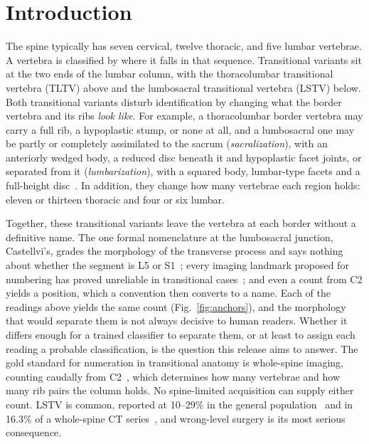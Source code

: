 \documentclass[aapm,mph,amsmath,amssymb,preprint,linenumbers]{revtex4-2}
\begin{document}
\maketitle

\section{Introduction}

The spine typically has seven cervical, twelve thoracic, and five lumbar vertebrae. A
vertebra is classified by where it falls in that sequence. Transitional variants sit at the
two ends of the lumbar column, with the thoracolumbar transitional vertebra (TLTV) above and the
lumbosacral transitional vertebra (LSTV) below. Both transitional variants disturb identification by changing what the border vertebra
and its ribs \emph{look like}. For example, a thoracolumbar border vertebra may carry a full rib, a hypoplastic stump, or none at all, and
a lumbosacral one may be partly or completely assimilated to the sacrum
(\emph{sacralization}), with an anteriorly wedged body, a reduced disc beneath it and
hypoplastic facet joints, or separated from it (\emph{lumbarization}), with a
squared body, lumbar-type facets and a full-height disc~\cite{koninwalz2010}. In addition, they
change how many vertebrae each region holds: eleven or thirteen thoracic and four or six lumbar.

Together, these transitional variants leave the vertebra at each border without a definitive name. The one formal nomenclature at the lumbosacral junction, Castellvi's, grades the morphology of the transverse process and says nothing about whether the segment is L5 or S1~\cite{castellvi1984,koninwalz2010}; every imaging landmark proposed for numbering has proved unreliable in transitional cases~\cite{carrino2011,farshad2015,tureli2014}; and even a count from C2 yields a position, which a convention then converts to a name. Each of the readings above yields the same count (Fig.~\ref{fig:anchors}), and the morphology that would
separate them is not always decisive to human readers. Whether it differs
enough for a trained classifier to separate them, or at least to assign each reading a probable classification,
is the question this release aims to answer. The gold standard for numeration in
transitional anatomy is whole-spine imaging, counting caudally from C2~\cite{lian2018},
which determines how many vertebrae and how many rib pairs the column holds. No
spine-limited acquisition can supply either count. LSTV is common, reported at 10--29\% in the general
population~\cite{hanhivaara2022} and in 16.3\% of a whole-spine CT
series~\cite{nagata2025}, and wrong-level surgery is its most serious consequence.
\end{document}
